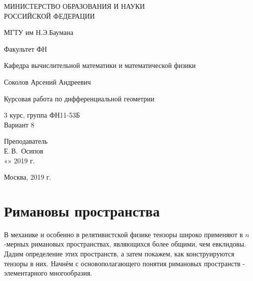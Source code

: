 \documentclass[14pt,a4paper]{scrartcl}
\begin{document}
	\begin{titlepage}
	\begin{center}
		\large
		МИНИСТЕРСТВО ОБРАЗОВАНИЯ И НАУКИ\\ РОССИЙСКОЙ ФЕДЕРАЦИИ
		
		\vspace{0.5cm}
		
		МГТУ им Н.Э.Баумана
		\vspace{0.25cm}
		
		Факультет ФН
		
		Кафедра вычислительной математики и математической физики
		\vfill
		
		
		Соколов Арсений Андреевич\\
		\vfill
		
		
		{\LARGE Курсовая работа по дифференциальной геометрии\\[2mm]
		}
		\bigskip
		
		3 курс, группа ФН11-53Б\\
		Вариант 8
	\end{center}
	\vfill
	
	\newlength{\ML}
	\hfill\begin{minipage}{0.4\textwidth}
		Преподаватель\\
		\underline{\hspace{3cm}} Е.\,В.~Осипов\\
		«\underline{\hspace{0.7cm}}» \underline{\hspace{1.71cm}} 2019 г.
	\end{minipage}%
	\bigskip
	
	
	\vfill
	
	\begin{center}
		Москва, 2019 г.
	\end{center}
\end{titlepage}
\tableofcontents
\parindent=1.25cm
\clearpage

\section{Римановы пространства}
В механике и особенно в релятивистской физике тензоры широко применяют в $n$-мерных римановых пространствах, являющихся более общими, чем евклидовы. Дадим определение этих пространств, а затем покажем, как конструируются тензоры в них. Начнём с основополагающего понятия римановых пространств - элементарного многообразия.
\end{document}
